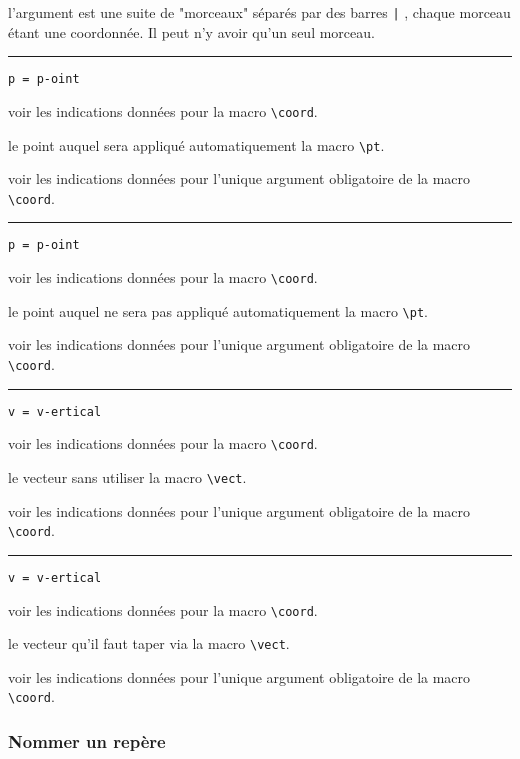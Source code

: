 \documentclass[12pt,a4paper]{article}
\newcommand\env[1]{\texttt{#1}}
\newcommand\macro[1]{\env{\textbackslash{}#1}}
\theoremstyle{definition}
\newcommand\separation{
	\medskip
	\hfill\rule{0.5\textwidth}{0.75pt}\hfill
	\medskip
}
\newcommand\mwhyprefix[2]{%
	\texttt{#1 = #1-#2}%
}
\begin{document}
\IDarg{} l'argument est une suite de "morceaux" séparés par des barres \verb+|+ , chaque morceau étant une coordonnée. Il peut n'y avoir qu'un seul morceau.


\separation


 \hfill \mwhyprefix{p}{oint}

\IDoption{} voir les indications données pour la macro \macro{coord}.

 le point auquel sera appliqué automatiquement la macro \macro{pt}.

 voir les indications données pour l'unique argument obligatoire de la macro \macro{coord}.


\separation


 \hfill \mwhyprefix{p}{oint}

\IDoption{} voir les indications données pour la macro \macro{coord}.

 le point auquel ne sera pas appliqué automatiquement la macro \macro{pt}.

 voir les indications données pour l'unique argument obligatoire de la macro \macro{coord}.


\separation


 \hfill \mwhyprefix{v}{ertical}

\IDoption{} voir les indications données pour la macro \macro{coord}.

 le vecteur sans utiliser la macro \macro{vect}.

 voir les indications données pour l'unique argument obligatoire de la macro \macro{coord}.


\separation


 \hfill \mwhyprefix{v}{ertical}

\IDoption{} voir les indications données pour la macro \macro{coord}.

 le vecteur qu'il faut taper via la macro \macro{vect}.

 voir les indications données pour l'unique argument obligatoire de la macro \macro{coord}.


\subsubsection{Nommer un repère}




\end{document}
